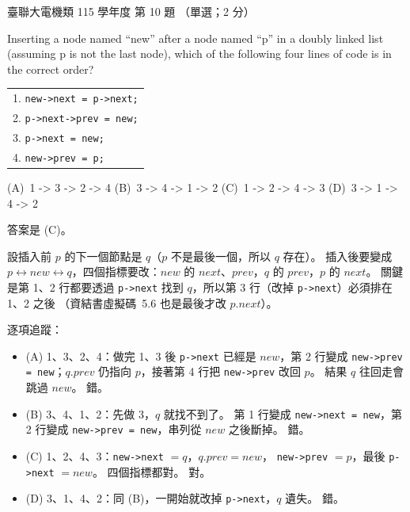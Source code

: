 \begin{pastexam}[label={px:ust-115-ee-ds-10}]{臺聯大電機類 115 學年度 第 10 題}
（單選；2 分）

Inserting a node named ``new'' after a node named ``p'' in a doubly linked list (assuming p is not
the last node), which of the following four lines of code is in the correct order?

\begin{tabular}{l}
1. \texttt{new->next = p->next;}\\
2. \texttt{p->next->prev = new;}\\
3. \texttt{p->next = new;}\\
4. \texttt{new->prev = p;}
\end{tabular}

(A)~1 -> 3 -> 2 -> 4 \qquad (B)~3 -> 4 -> 1 -> 2 \qquad (C)~1 -> 2 -> 4 -> 3 \qquad (D)~3 -> 1 -> 4 -> 2
\end{pastexam}

\begin{pastsoln}
答案是 (C)。

設插入前 $p$ 的下一個節點是 $q$（$p$ 不是最後一個，所以 $q$ 存在）。 插入後要變成
$p \leftrightarrow \mathit{new} \leftrightarrow q$，四個指標要改：$\mathit{new}$ 的
$\mathit{next}$、$\mathit{prev}$，$q$ 的 $\mathit{prev}$，$p$ 的 $\mathit{next}$。 關鍵是第 1、2
行都要透過 \texttt{p->next} 找到 $q$，所以第 3 行（改掉 \texttt{p->next}）必須排在 1、2 之後
（資結書虛擬碼~5.6 也是最後才改 $p.\mathit{next}$）。

逐項追蹤：
\begin{itemize}
\item (A) 1、3、2、4：做完 1、3 後 \texttt{p->next} 已經是 $\mathit{new}$，第 2 行變成
\texttt{new->prev = new}；$q.\mathit{prev}$ 仍指向 $p$，接著第 4 行把 \texttt{new->prev} 改回
$p$。 結果 $q$ 往回走會跳過 $\mathit{new}$。 錯。
\item (B) 3、4、1、2：先做 3，$q$ 就找不到了。 第 1 行變成 \texttt{new->next = new}，第 2 行變成
\texttt{new->prev = new}，串列從 $\mathit{new}$ 之後斷掉。 錯。
\item (C) 1、2、4、3：\texttt{new->next} $= q$，$q.\mathit{prev} = \mathit{new}$，
\texttt{new->prev} $= p$，最後 \texttt{p->next} $= \mathit{new}$。 四個指標都對。 對。
\item (D) 3、1、4、2：同 (B)，一開始就改掉 \texttt{p->next}，$q$ 遺失。 錯。
\end{itemize}
\end{pastsoln}
